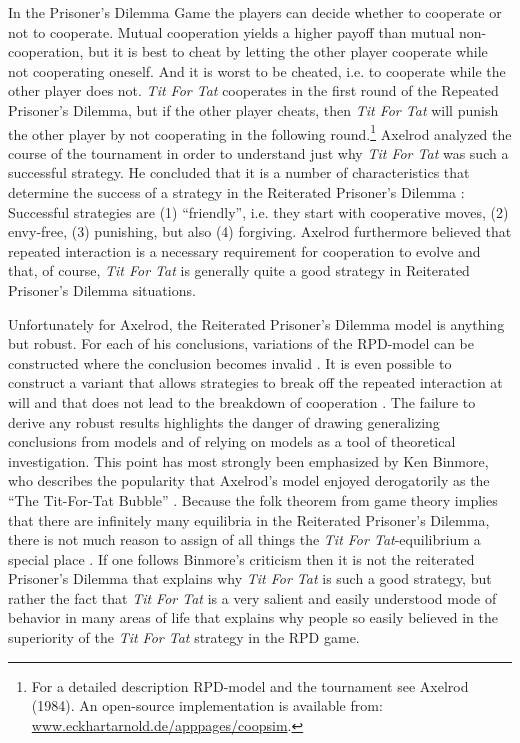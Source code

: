 \documentclass[12pt, english, a4paper]{article}
\begin{document}
In the Prisoner’s Dilemma Game the players can decide whether to
cooperate or not to cooperate. Mutual cooperation yields a higher
payoff than mutual non-cooperation, but it is best to cheat by letting
the other player cooperate while not cooperating oneself. And it is
worst to be cheated, i.e. to cooperate while the other player does
not. {\em Tit For Tat} cooperates in the first round of the Repeated
Prisoner’s Dilemma, but if the other player cheats, then {\em Tit For
  Tat} will punish the other player by not cooperating in the
following round.\footnote{For a detailed description RPD-model and the
  tournament see Axelrod (1984). An open-source implementation is
  available from: \url{www.eckhartarnold.de/apppages/coopsim}.}
Axelrod analyzed the course of the tournament in order to understand
just why {\em Tit For Tat} was such a successful strategy. He
concluded that it is a number of characteristics that determine the
success of a strategy in the Reiterated Prisoner’s Dilemma
\citep[chapter 6]{axelrod:1984}: Successful strategies are (1)
“friendly”, i.e. they start with cooperative moves, (2) envy-free, (3)
punishing, but also (4) forgiving. Axelrod furthermore believed that
repeated interaction is a necessary requirement for cooperation to
evolve and that, of course, {\em Tit For Tat} is generally quite a
good strategy in Reiterated Prisoner’s Dilemma situations.

Unfortunately for Axelrod, the Reiterated Prisoner’s Dilemma model is
anything but robust. For each of his conclusions, variations of the
RPD-model can be constructed where the conclusion becomes invalid
\citep[107]{arnold:2013}. It is even possible to construct a variant
that allows strategies to break off the repeated interaction at will
and that does not lead to the breakdown of cooperation
\citep{schuessler:1990}. The failure to derive any robust results
highlights the danger of drawing generalizing conclusions from models
and of relying on models as a tool of theoretical investigation. This
point has most strongly been emphasized by Ken Binmore, who describes
the popularity that Axelrod’s model enjoyed derogatorily as the “The
Tit-For-Tat Bubble” \citep[194]{binmore:1994}. Because the folk
theorem from game theory implies that there are infinitely many
equilibria in the Reiterated Prisoner’s Dilemma, there is not much
reason to assign of all things the {\em Tit For Tat}-equilibrium a
special place \citep[313-317]{binmore:1994}. If one follows Binmore’s
criticism then it is not the reiterated Prisoner’s Dilemma that
explains why {\em Tit For Tat} is such a good strategy, but rather the
fact that {\em Tit For Tat} is a very salient and easily understood
mode of behavior in many areas of life that explains why people so
easily believed in the superiority of the {\em Tit For Tat} strategy
in the RPD
game. %
\end{document}
